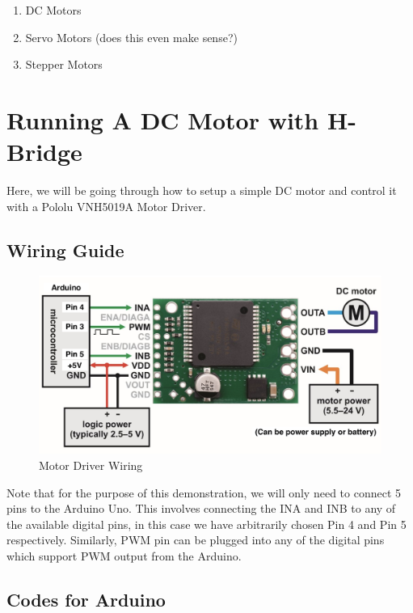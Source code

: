 \documentclass[paper=a4, fontsize=11pt]{article} %
\providecommand{\tightlist}{%
  \setlength{\itemsep}{0pt}\setlength{\parskip}{0pt}}
\numberwithin{equation}{section} %
\numberwithin{figure}{section} %
\numberwithin{table}{section} %
\begin{document}

\begin{enumerate}
\def\labelenumi{\arabic{enumi}.}
\tightlist
\item
  DC Motors
\item
  Servo Motors (does this even make sense?)
\item
  Stepper Motors
\end{enumerate}


\newpage

\section{Running A DC Motor with H-Bridge}
Here, we will be going through how to setup a simple DC motor and control it with a Pololu VNH5019A Motor Driver.

\subsection{Wiring Guide}

\begin{figure}[H]
    \centering
    \includegraphics[width = 0.8 \textwidth]{motor_driver_wiring.png}
    \caption{Motor Driver Wiring}
    \label{fig:motor_driver_wiring}
\end{figure}

Note that for the purpose of this demonstration, we will only need to connect 5 pins to the Arduino Uno. This involves connecting the INA and INB to any of the available digital pins, in this case we have arbitrarily chosen Pin 4 and Pin 5 respectively. Similarly, PWM pin can be plugged into any of the digital pins which support PWM output from the Arduino.

\subsection{Codes for Arduino}
\end{document}
